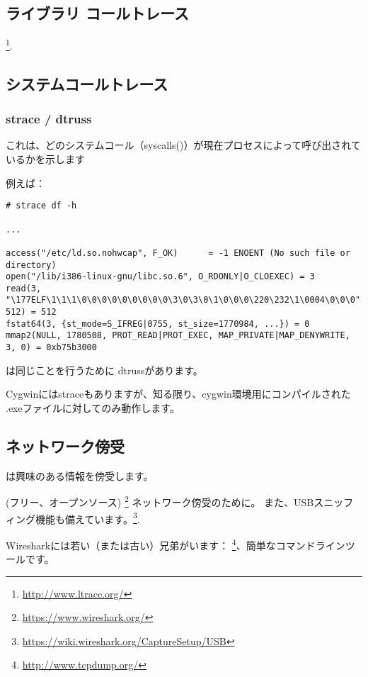 \subsection{ライブラリ コールトレース}

\footnote{\url{http://www.ltrace.org/}}.

\subsection{システムコールトレース}

\label{strace}
\subsubsection{strace / dtruss}

これは、どのシステムコール（syscalls()）が現在プロセスによって呼び出されているかを示します

例えば：

\begin{lstlisting}
# strace df -h

...

access("/etc/ld.so.nohwcap", F_OK)      = -1 ENOENT (No such file or directory)
open("/lib/i386-linux-gnu/libc.so.6", O_RDONLY|O_CLOEXEC) = 3
read(3, "\177ELF\1\1\1\0\0\0\0\0\0\0\0\0\3\0\3\0\1\0\0\0\220\232\1\0004\0\0\0"..., 512) = 512
fstat64(3, {st_mode=S_IFREG|0755, st_size=1770984, ...}) = 0
mmap2(NULL, 1780508, PROT_READ|PROT_EXEC, MAP_PRIVATE|MAP_DENYWRITE, 3, 0) = 0xb75b3000
\end{lstlisting}

\myindex{\MacOSX}
\MacOSX は同じことを行うために dtrussがあります。

Cygwinにはstraceもありますが、知る限り、cygwin環境用にコンパイルされた
.exeファイルに対してのみ動作します。

\subsection{ネットワーク傍受}

は興味のある情報を傍受します。

(フリー、オープンソース) \footnote{\url{https://www.wireshark.org/}} ネットワーク傍受のために。
また、USBスニッフィング機能も備えています。\footnote{\url{https://wiki.wireshark.org/CaptureSetup/USB}}.

Wiresharkには若い（または古い）兄弟がいます： \footnote{\url{http://www.tcpdump.org/}}、簡単なコマンドラインツールです。

